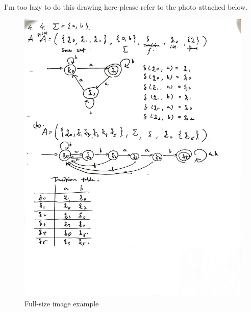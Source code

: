 \documentclass[12pt]{article}
\begin{document}
\section{}
I'm too lazy to do this drawing here please refer to the photo attached below.
\begin{figure}[htbp]
    \centering
    \includegraphics[width=\textwidth]{Tut1/4ab.jpg}
    \caption{Full-size image example}
    \label{fig:fullsize}
\end{figure}
\end{document}

